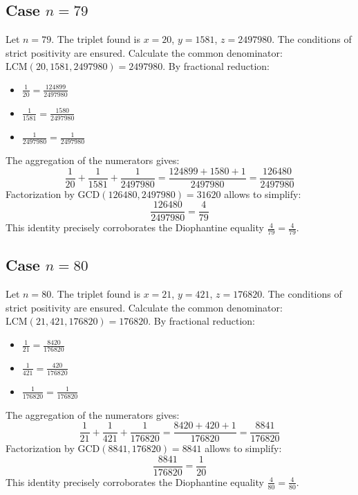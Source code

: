 \documentclass[11pt,a4paper]{article}
\begin{document}
\subsection{Case $n = 79$}
Let $n = 79$. The triplet found is $x = 20$, $y = 1581$, $z = 2497980$.
The conditions of strict positivity are ensured.
Calculate the common denominator: $\text{LCM}(20, 1581, 2497980) = 2497980$.
By fractional reduction:
\begin{itemize}
    \item $\frac{1}{20} = \frac{124899}{2497980}$
    \item $\frac{1}{1581} = \frac{1580}{2497980}$
    \item $\frac{1}{2497980} = \frac{1}{2497980}$
\end{itemize}
The aggregation of the numerators gives:
$$ \frac{1}{20} + \frac{1}{1581} + \frac{1}{2497980} = \frac{124899 + 1580 + 1}{2497980} = \frac{126480}{2497980} $$
Factorization by $\text{GCD}(126480, 2497980) = 31620$ allows to simplify:
$$ \frac{126480}{2497980} = \frac{4}{79} $$
This identity precisely corroborates the Diophantine equality $\frac{4}{79} = \frac{4}{79}$.

\subsection{Case $n = 80$}
Let $n = 80$. The triplet found is $x = 21$, $y = 421$, $z = 176820$.
The conditions of strict positivity are ensured.
Calculate the common denominator: $\text{LCM}(21, 421, 176820) = 176820$.
By fractional reduction:
\begin{itemize}
    \item $\frac{1}{21} = \frac{8420}{176820}$
    \item $\frac{1}{421} = \frac{420}{176820}$
    \item $\frac{1}{176820} = \frac{1}{176820}$
\end{itemize}
The aggregation of the numerators gives:
$$ \frac{1}{21} + \frac{1}{421} + \frac{1}{176820} = \frac{8420 + 420 + 1}{176820} = \frac{8841}{176820} $$
Factorization by $\text{GCD}(8841, 176820) = 8841$ allows to simplify:
$$ \frac{8841}{176820} = \frac{1}{20} $$
This identity precisely corroborates the Diophantine equality $\frac{4}{80} = \frac{4}{80}$.
\end{document}
